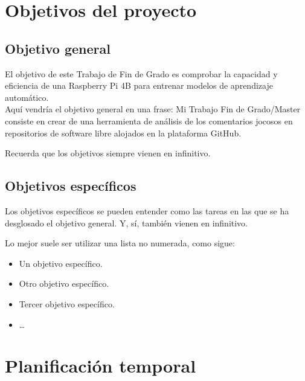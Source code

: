 \documentclass[a4paper, 12pt]{book}
\begin{document}

\section{Objetivos del proyecto}
\label{sec:objetivos}

\subsection{Objetivo general} %
\label{sec:objetivo-general} %


El objetivo de este Trabajo de Fin de Grado es comprobar la capacidad y eficiencia de una Raspberry Pi 4B para entrenar modelos de aprendizaje automático.\\

Aquí vendría el objetivo general en una frase:
Mi Trabajo Fin de Grado/Master consiste en crear de una herramienta de análisis de los comentarios jocosos en repositorios de software libre alojados en la plataforma GitHub.

Recuerda que los objetivos siempre vienen en infinitivo.


\subsection{Objetivos específicos}
\label{sec:objetivos-especificos}

Los objetivos específicos se pueden entender como las tareas en las que se ha desglosado el objetivo general. Y, sí, también vienen en infinitivo.

Lo mejor suele ser utilizar una lista no numerada, como sigue:

    \begin{itemize}
        \item Un objetivo específico.
        \item Otro objetivo específico.
        \item Tercer objetivo específico.
        \item \ldots
    \end{itemize}

\section{Planificación temporal}
\label{sec:planificacion-temporal}
\end{document}
